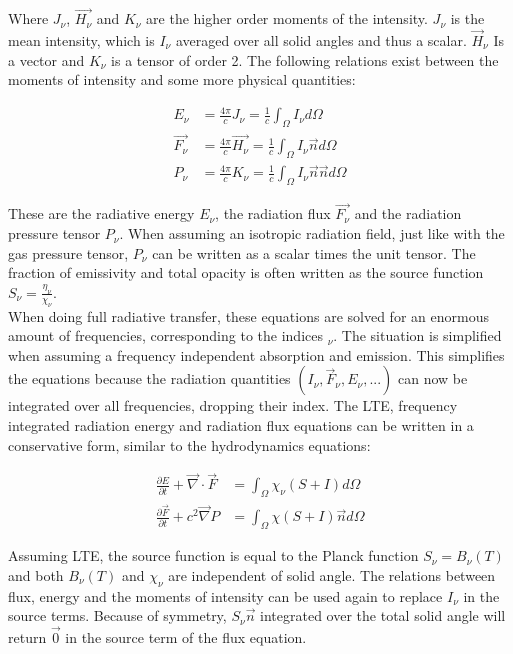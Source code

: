 Where $J_\nu$, $\vec{H_\nu}$ and $K_\nu$ are the higher order moments of the intensity. $J_\nu$ is the mean intensity, which is $I_\nu$ averaged over all solid angles and thus a scalar. $\vec{H}_\nu$ Is a vector and $K_\nu$ is a tensor of order 2. The following relations exist between the moments of intensity and some more physical quantities:

\begin{align}
E_\nu &= \frac{4 \pi}{c} J_\nu = \frac{1}{c} \int_\Omega I_\nu d \Omega\\
\vec{F_\nu} &= \frac{4 \pi}{c} \vec{H_\nu} = \frac{1}{c} \int_\Omega I_\nu \vec{n} d \Omega\\
P_\nu &= \frac{4 \pi}{c} K_\nu = \frac{1}{c} \int_\Omega I_\nu \vec{n}\vec{n} d \Omega
\end{align}

These are the radiative energy $E_\nu$, the radiation flux $\vec{F_\nu}$ and the radiation pressure tensor $P_\nu$. When assuming an isotropic radiation field, just like with the gas pressure tensor, $P_\nu$ can be written as a scalar times the unit tensor. The fraction of emissivity and total opacity is often written as the source function $S_\nu = \frac{\eta_\nu}{\chi_\nu}$. \\
 When doing full radiative transfer, these equations are solved for an enormous amount of frequencies, corresponding to the indices $_\nu$. The situation is simplified when assuming a frequency independent absorption and emission. This simplifies the equations because the radiation quantities $(I_\nu, \vec{F}_\nu, E_\nu, ...)$ can now be integrated over all frequencies, dropping their index. The LTE, frequency integrated radiation energy and radiation flux equations can be written in a conservative form, similar to the hydrodynamics equations: 

\begin{align}
\frac{\partial E}{\partial t} + \vec{\nabla} \cdot \vec{F} &= \int_\Omega \chi_\nu \left( S + I \right) d\Omega \label{eq: E_si}\\
\frac{\partial \vec{F}}{\partial t} + c^2 \vec{\nabla} P &= \int_\Omega \chi \left( S + I \right) \vec{n} d\Omega \label{F_si}
\end{align}

Assuming LTE, the source function is equal to the Planck function $S_\nu = B_\nu(T)$ and both $B_\nu(T)$ and $\chi_\nu$ are independent of solid angle. The relations between flux, energy and the moments of intensity can be used again to replace $I_\nu$ in the source terms. Because of symmetry, $S_\nu \vec{n}$ integrated over the total solid angle will return $\vec{0}$ in the source term of the flux equation.\\

